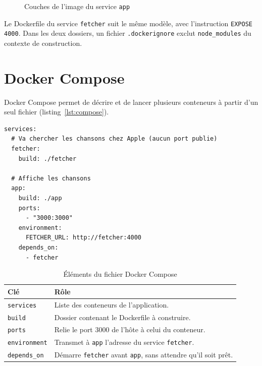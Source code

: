 \documentclass[11pt,a4paper]{article}
\begin{document}
\begin{figure}[H]
\centering
{}
\caption{Couches de l'image du service \texttt{app}}
\label{fig:couches}
\end{figure}

Le Dockerfile du service \texttt{fetcher} suit le même modèle, avec l'instruction
\texttt{EXPOSE 4000}. Dans les deux dossiers, un fichier \texttt{.dockerignore}
exclut \texttt{node\_modules} du contexte de construction.

\section{Docker Compose}
Docker Compose permet de décrire et de lancer plusieurs conteneurs à partir d'un
seul fichier (listing~\ref{lst:compose}).

\begin{lstlisting}[caption={Fichier docker-compose.yml}, label={lst:compose}]
services:
  # Va chercher les chansons chez Apple (aucun port publie)
  fetcher:
    build: ./fetcher

  # Affiche les chansons
  app:
    build: ./app
    ports:
      - "3000:3000"
    environment:
      FETCHER_URL: http://fetcher:4000
    depends_on:
      - fetcher
\end{lstlisting}

\begin{table}[H]
\centering
\begin{tabular}{lp{11.5cm}}
\toprule
\textbf{Clé} & \textbf{Rôle} \\
\midrule
\texttt{services}    & Liste des conteneurs de l'application. \\
\texttt{build}       & Dossier contenant le Dockerfile à construire. \\
\texttt{ports}       & Relie le port 3000 de l'hôte à celui du conteneur. \\
\texttt{environment} & Transmet à \texttt{app} l'adresse du service \texttt{fetcher}. \\
\texttt{depends\_on} & Démarre \texttt{fetcher} avant \texttt{app}, sans attendre qu'il soit prêt. \\
\bottomrule
\end{tabular}
\caption{Éléments du fichier Docker Compose}
\end{table}
\end{document}
